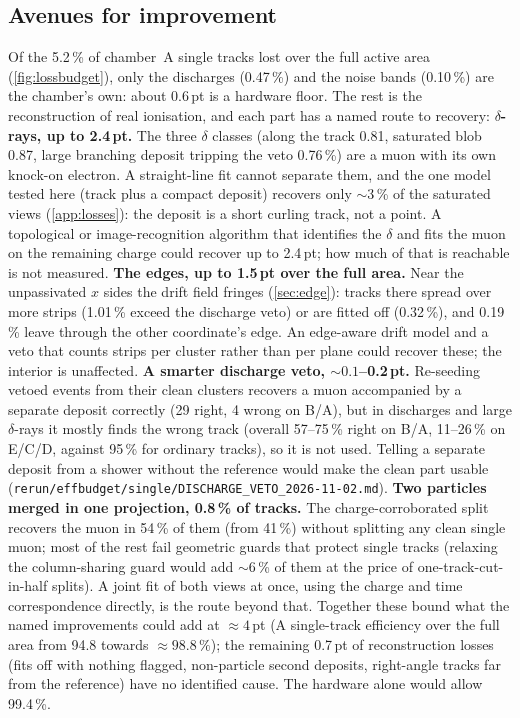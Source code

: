 \subsection{Avenues for improvement}\label{sec:improve}
Of the 5.2\,\% of chamber~A single tracks lost over the full active area (\cref{fig:lossbudget}), only the discharges
(0.47\,\%) and the noise bands (0.10\,\%) are the chamber's own: about 0.6\,pt is a hardware floor. The rest is the
reconstruction of real ionisation, and each part has a named route to recovery:
\textbf{$\delta$-rays, up to 2.4\,pt.} The three $\delta$ classes (along the track 0.81, saturated blob 0.87, large
branching deposit tripping the veto 0.76\,\%) are a muon with its own knock-on electron. A straight-line fit cannot
separate them, and the one model tested here (track plus a compact deposit) recovers only ${\sim}3$\,\% of the saturated
views (\cref{app:losses}): the deposit is a short curling track, not a point. A topological or image-recognition
algorithm that identifies the $\delta$ and fits the muon on the remaining charge could recover up to 2.4\,pt; how much
of that is reachable is not measured.
\textbf{The edges, up to 1.5\,pt over the full area.} Near the unpassivated $x$ sides the drift field fringes
(\cref{sec:edge}): tracks there spread over more strips (1.01\,\% exceed the discharge veto) or are fitted off (0.32\,\%), and
0.19\,\% leave through the other coordinate's edge. An edge-aware drift model and a veto that counts strips per cluster
rather than per plane could recover these; the interior is unaffected.
\textbf{A smarter discharge veto, ${\sim}0.1$--0.2\,pt.} Re-seeding vetoed events from their clean clusters recovers a
muon accompanied by a separate deposit correctly (29 right, 4 wrong on B/A), but in discharges and large
$\delta$-rays it mostly finds the wrong track (overall 57--75\,\% right on B/A, 11--26\,\% on E/C/D, against
95\,\% for ordinary tracks), so it is not used. Telling a separate deposit from a shower without the reference would
make the clean part usable (\texttt{rerun/effbudget/single/DISCHARGE\_VETO\_2026-11-02.md}).
\textbf{Two particles merged in one projection, 0.8\,\% of tracks.} The charge-corroborated split recovers the muon
in 54\,\% of them (from 41\,\%) without splitting any clean single muon; most of the rest fail geometric guards that
protect single tracks (relaxing the column-sharing guard would add ${\sim}6$\,\% of them at the price of
one-track-cut-in-half splits). A joint fit of both views at once, using the charge and time correspondence directly,
is the route beyond that.
Together these bound what the named improvements could add at ${\approx}4$\,pt (A single-track efficiency over the
full area from 94.8 towards ${\approx}98.8\,\%$); the remaining 0.7\,pt of reconstruction losses (fits off with nothing
flagged, non-particle second deposits, right-angle tracks far from the reference) have no identified cause. The hardware alone
would allow 99.4\,\%.


